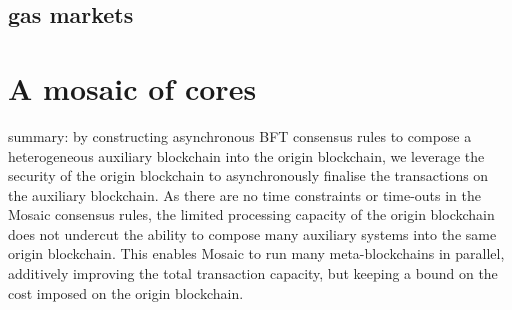 \documentclass[12pt,a4paper]{article}
\begin{document}
\subsection{gas markets}

%
%
\section{A mosaic of cores}

summary:
by constructing asynchronous BFT consensus rules to compose a heterogeneous auxiliary blockchain into the origin blockchain, we leverage the security of the origin blockchain to asynchronously finalise the transactions on the auxiliary blockchain.
As there are no time constraints or time-outs in the Mosaic consensus rules, the limited processing capacity of the origin blockchain does not undercut the ability to compose many auxiliary systems into the same origin blockchain.
This enables Mosaic to run many meta-blockchains in parallel, additively improving the total transaction capacity, but keeping a bound on the cost imposed on the origin blockchain.
%
%
\end{document}
